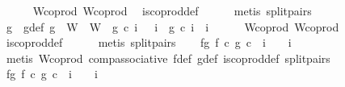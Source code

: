 \begin{isabellebody}
\ \ \ \ \isamarkupfalse%
\ W{\isacharunderscore}{\kern0pt}coprod\ W{\isacharprime}{\kern0pt}{\isacharunderscore}{\kern0pt}coprod\ \isamarkupfalse%
\ is{\isacharunderscore}{\kern0pt}coprod{\isacharunderscore}{\kern0pt}def\isanewline
\ \ \ \ \isamarkupfalse%
\ {\isacharparenleft}{\kern0pt}metis\ split{\isacharunderscore}{\kern0pt}pairs{\isacharparenright}{\kern0pt}\isanewline
\isanewline
\ \ \isamarkupfalse%
\ g\ \ g{\isacharunderscore}{\kern0pt}def{\isacharcolon}{\kern0pt}\ {\isachardoublequoteopen}g\ {\isacharcolon}{\kern0pt}\ W\ {\isasymrightarrow}\ W{\isacharprime}{\kern0pt}\ {\isasymand}\ g\ {\isasymcirc}\isactrlsub c\ i\ \ {\isacharequal}{\kern0pt}\ i{\isacharprime}{\kern0pt}\ {\isasymand}\ g\ {\isasymcirc}\isactrlsub c\ i\ {\isacharequal}{\kern0pt}\ i{\isacharprime}{\kern0pt}\isanewline
\ \ \ \ \isamarkupfalse%
\ W{\isacharunderscore}{\kern0pt}coprod\ W{\isacharprime}{\kern0pt}{\isacharunderscore}{\kern0pt}coprod\ \isamarkupfalse%
\ is{\isacharunderscore}{\kern0pt}coprod{\isacharunderscore}{\kern0pt}def\isanewline
\ \ \ \ \isamarkupfalse%
\ {\isacharparenleft}{\kern0pt}metis\ split{\isacharunderscore}{\kern0pt}pairs{\isacharparenright}{\kern0pt}\isanewline
\isanewline
\ \ \isamarkupfalse%
\ fg{}{\isacharcolon}{\kern0pt}\ {\isachardoublequoteopen}{\isacharparenleft}{\kern0pt}f\ {\isasymcirc}\isactrlsub c\ g{\isacharparenright}{\kern0pt}\ {\isasymcirc}\isactrlsub c\ \ i\ \ \ {\isacharequal}{\kern0pt}\ i\isanewline
\ \ \ \ \isamarkupfalse%
\ {\isacharparenleft}{\kern0pt}metis\ W{\isacharunderscore}{\kern0pt}coprod\ comp{\isacharunderscore}{\kern0pt}associative{}\ f{\isacharunderscore}{\kern0pt}def\ g{\isacharunderscore}{\kern0pt}def\ is{\isacharunderscore}{\kern0pt}coprod{\isacharunderscore}{\kern0pt}def\ split{\isacharunderscore}{\kern0pt}pairs{\isacharparenright}{\kern0pt}\isanewline
\ \ \isamarkupfalse%
\ fg{}{\isacharcolon}{\kern0pt}\ {\isachardoublequoteopen}{\isacharparenleft}{\kern0pt}f\ {\isasymcirc}\isactrlsub c\ g{\isacharparenright}{\kern0pt}\ {\isasymcirc}\isactrlsub c\ \ i\ \ \ {\isacharequal}{\kern0pt}\ i\isanewline
\ \ \ \ \isamarkupfalse%

\end{isabellebody}
